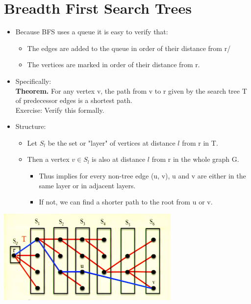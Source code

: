 \documentclass[12pt]{article}
\begin{document}
\section{Breadth First Search Trees}
\renewcommand{\labelitemii}{$\circ$}
\renewcommand{\labelitemiii}{$\cdot$}
\renewcommand{\labelitemiii}{$\rightarrow$}
\renewcommand{\labelitemiv}{$\star$}
\begin{itemize}
\item Because BFS uses a queue it is easy to verify that:
	\begin{itemize}
	\item The edges are added to the queue in order of their distance from r/
	\item The vertices are marked in order of their distance from r.
	\end{itemize}
\item Specifically:\\
\textbf{Theorem.} For any vertex v, the path from v to r given by the search tree T of predecessor edges is a shortest path.\\
Exercise: Verify this formally.
\item Structure:
	\begin{itemize}
	\item Let $S_l$ be the set or "layer" of vertices at distance $l$ from r in T.
	\item Then a vertex $v \in S_l$ is also at distance $l$ from r in the whole graph G.
		\begin{itemize}
		\item Thus implies for every non-tree edge (u, v), u and v are either in the same layer or in adjacent layers.
		\item If not, we can find a shorter path to the root from u or v.
		\end{itemize}
	\end{itemize}
\end{itemize}
\begin{center}
\includegraphics{lecture83}
\end{center}
\end{document}
